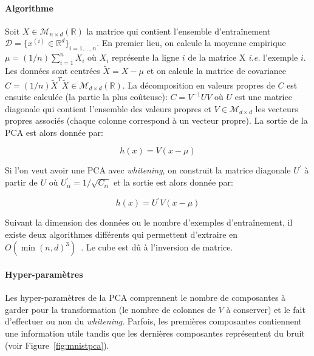 \paragraph{Algorithme} Soit $X\in\mathcal{M}_{n\times d}(\mathbb{R})$ la
matrice qui contient l'ensemble d'entraînement $\mathcal{D}=\lbrace
x^{(i)}\in\mathbb{R}^d \rbrace_{i=1,\dots,n}$.  En premier lieu, on calcule la
moyenne empirique $\mu=(1/n)\sum_{i=1}^{n}X_i$ où $X_i$ représente la ligne $i$
de la matrice X \textit{i.e.} l'exemple $i$. Les données sont centrées
$\tilde{X}=X-\mu$ et on calcule la matrice de covariance
$C=(1/n)\tilde{X}^T\tilde{X}\in\mathcal{M}_{d\times d}(\mathbb{R})$. La décomposition en valeurs propres de $C$ est
ensuite calculée (la partie la plus co\^uteuse): $C=V^{-1}UV$ où
$U$ est une matrice diagonale qui contient l'ensemble des valeurs propres
et $V\in\mathcal{M}_{d\times d}$ les vecteurs propres associés (chaque colonne
correspond à un vecteur propre). La sortie de la PCA est alors donnée par:

\begin{equation}
h(x)=V(x-\mu)
\end{equation}

Si l'on veut avoir une PCA avec \textit{whitening}, on construit la matrice
diagonale $U^{'}$ à partir de $U$ où $U^{'}_{ii}=1/\sqrt{C_{ii}}$ et la sortie
est alors donnée par:

\begin{equation}
h(x)=U^{'}V(x-\mu)
\end{equation}


Suivant la dimension des données ou le nombre d'exemples d'entraînement, il
existe deux algorithmes différents qui permettent d'extraire en
$O(\min(n,d)^3)$~\citep{bishop-book2006}.  Le cube est dû à l'inversion de
matrice.

\paragraph{Hyper-paramètres} Les hyper-paramètres de la PCA comprennent le
nombre de composantes à garder pour la transformation (le nombre de colonnes de
$V$ à conserver) et le fait d'effectuer ou non du \textit{whitening}. Parfois,
les premières composantes contiennent une information utile tandis que les
dernières composantes représentent du bruit (voir Figure~\ref{fig:mnistpca}).


